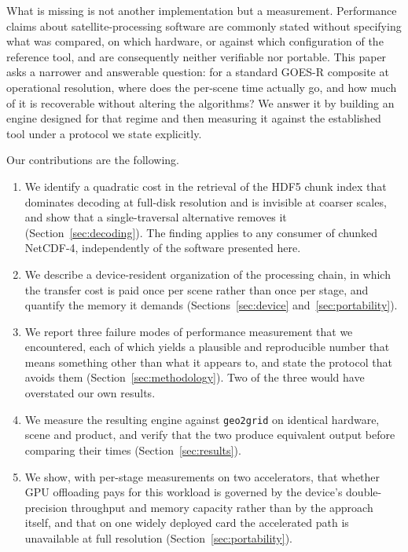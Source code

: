 \documentclass{ametsocV6.1}
\begin{document}
What is missing is not another implementation but a measurement. Performance
claims about satellite-processing software are commonly stated without
specifying what was compared, on which hardware, or against which
configuration of the reference tool, and are consequently neither verifiable
nor portable. This paper asks a narrower and answerable question: for a
standard GOES-R composite at operational resolution, where does the per-scene
time actually go, and how much of it is recoverable without altering the
algorithms? We answer it by building an engine designed for that regime and
then measuring it against the established tool under a protocol we state
explicitly.

Our contributions are the following.

\begin{enumerate}
\item We identify a quadratic cost in the retrieval of the HDF5 chunk index
that dominates decoding at full-disk resolution and is invisible at coarser
scales, and show that a single-traversal alternative removes it
(Section~\ref{sec:decoding}). The finding applies to any consumer of chunked
NetCDF-4, independently of the software presented here.

\item We describe a device-resident organization of the processing chain, in
which the transfer cost is paid once per scene rather than once per stage, and
quantify the memory it demands (Sections~\ref{sec:device}
and~\ref{sec:portability}).

\item We report three failure modes of performance measurement that we
encountered, each of which yields a plausible and reproducible number that
means something other than what it appears to, and state the protocol that
avoids them (Section~\ref{sec:methodology}). Two of the three would have
overstated our own results.

\item We measure the resulting engine against \texttt{geo2grid} on identical
hardware, scene and product, and verify that the two produce equivalent output
before comparing their times (Section~\ref{sec:results}).

\item We show, with per-stage measurements on two accelerators, that whether
GPU offloading pays for this workload is governed by the device's
double-precision throughput and memory capacity rather than by the approach
itself, and that on one widely deployed card the accelerated path is
unavailable at full resolution (Section~\ref{sec:portability}).
\end{enumerate}
\end{document}

